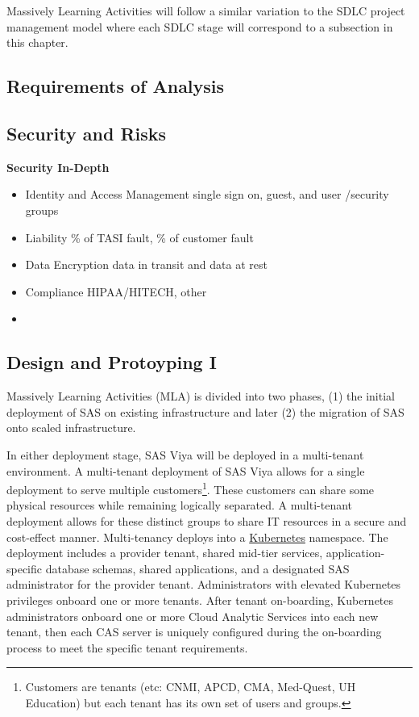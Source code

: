 Massively Learning Activities will follow a similar variation to the SDLC project management model where each SDLC stage will correspond to a subsection in this chapter. 

\subsection{Requirements of Analysis}


\subsection{Security and Risks}
\textbf{Security In-Depth}
\begin{itemize}
    \item Identity and Access Management
    single sign on, guest, and user /security groups
    \item Liability
    \% of TASI fault, \% of customer fault 
    \item Data Encryption
    data in transit and data at rest 
    \item Compliance
    HIPAA/HITECH, other
    \item 
\end{itemize}

\subsection{Design and Protoyping I}
Massively Learning Activities (MLA) is divided into two phases, (1) the initial deployment of SAS on existing infrastructure and later (2) the migration of SAS onto scaled infrastructure. 

In either deployment stage, SAS Viya will be deployed in a multi-tenant environment. A multi-tenant deployment of SAS Viya allows for a single deployment to serve multiple customers\footnote{Customers are tenants (etc: CNMI, APCD, CMA, Med-Quest, UH Education) but each tenant has its own set of users and groups.}. These customers can share some physical resources while remaining logically separated. A multi-tenant deployment allows for these distinct groups to share IT resources in a secure and cost-effect manner. Multi-tenancy deploys into a \href{https://kubernetes.io/}{Kubernetes} namespace. The deployment includes a provider tenant, shared mid-tier services, application-specific database schemas, shared applications, and a designated SAS administrator for the provider tenant. Administrators with elevated Kubernetes privileges onboard one or more tenants. After tenant on-boarding, Kubernetes administrators onboard one or more Cloud Analytic Services into each new tenant, then each CAS server is uniquely configured during the on-boarding process to meet the specific tenant requirements. 

